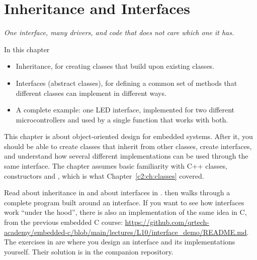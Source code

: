 
\chapter{Inheritance and Interfaces}
\label{c3:ch:interfaces}

{\large\itshape One interface, many drivers, and code that does not care which one it has.\par}

\begin{chapterbox}{In this chapter}
\begin{itemize}
  \item Inheritance, for creating classes that build upon existing classes.
  \item Interfaces (abstract classes), for defining a common set of methods that different classes
    can implement in different ways.
  \item A complete example: one LED interface, implemented for two different microcontrollers and
    used by a single function that works with both.
\end{itemize}
\end{chapterbox}

This chapter is about object-oriented design for embedded systems. After it, you should be able to
create classes that inherit from other classes, create interfaces, and understand how several
different implementations can be used through the same interface. The chapter assumes basic
familiarity with C++ classes, constructors and , which is what
Chapter~\ref{c2:ch:classes} covered.

Read about inheritance in  and about interfaces in
.  then walks through a complete program built
around an interface. If you want to see how interfaces work ``under the hood'', there is also an
implementation of the same idea in C, from the previous embedded C course:
\url{https://github.com/qrtech-academy/embedded-c/blob/main/lectures/L10/interface_demo/README.md}.
The exercises in  are where you design an interface and its
implementations yourself. Their solution is in the companion repository.






